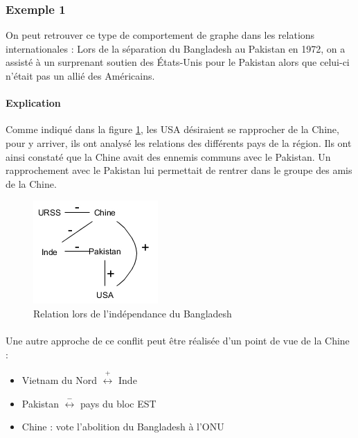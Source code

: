 \subsubsection*{Exemple 1}

On peut retrouver ce type de comportement de graphe dans les relations internationales : Lors de la séparation du Bangladesh au Pakistan en 1972, on a assisté à un surprenant soutien des États-Unis pour le Pakistan alors que celui-ci n'était pas un allié des Américains. 
\paragraph{Explication} 
Comme indiqué dans la figure \ref{paysconflit}, les USA désiraient se rapprocher de la Chine, pour y arriver, ils ont analysé les relations des différents pays de la région. Ils ont ainsi constaté que la Chine avait des ennemis communs avec le Pakistan. Un rapprochement avec le Pakistan lui permettait de rentrer dans le groupe des amis de la Chine.


\begin{figure}[h!]
\label{groupami}
\label{paysconflit}
\caption{Relation lors de l'indépendance du Bangladesh}
\centering
\includegraphics[scale=1]{images/22_pays-conflit.png}
\end{figure}
\paragraph{}
Une autre approche de ce conflit peut être réalisée d'un point de vue de la Chine : 
\begin{itemize}

\item Vietnam du Nord $\overset{+}{\longleftrightarrow}$ Inde

\item Pakistan $\overset{-}{\longleftrightarrow}$ pays du bloc EST

\item Chine : vote l'abolition du Bangladesh à l'ONU

\end{itemize}

